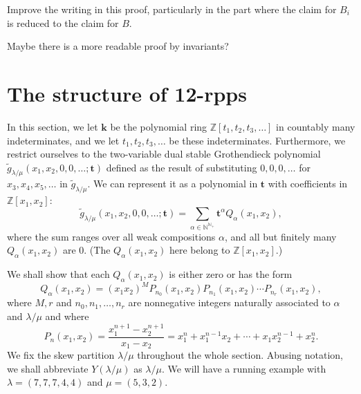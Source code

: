 \documentclass[numbers=enddot,12pt,final,onecolumn,notitlepage]{scrartcl}%
\theoremstyle{definition}
\newenvironment{todo}{}{}
\newcommand{\kk}{\mathbf{k}}
\let\sumnonlimits\sum
\renewcommand{\sum}{\sumnonlimits\limits}
\begin{document}
\begin{todo}
Improve the writing in this proof, particularly in the part where the
claim for $B_i$ is reduced to the claim for $B$.

Maybe there is a more readable proof by invariants?
\end{todo}



\section{The structure of 12-rpps}
\label{sect.structure}

\def\seplist{{\operatorname{seplist}}} %
\def\ceq{{\operatorname{ceq}}}
\def\ircont{{\operatorname{ircont}}}
\def\cont{{\operatorname{cont}}}
\def\ceqvar{{{\alpha}}} %
\def\seplistvar{{{\nu}}} %
\def\supp{{\operatorname{supp}}}
\def\NS{{\operatorname{NR}}}
\def\g{{\widetilde{g}}}
\def\t{{\mathbf{t}}}
\def\x{{\mathbf{x}}}
\def\lm{{\lambda/\mu}}
\def\lmp{{(\lambda/\mu)}}
\def\N{{\mathbb{N}}}
\def\Z{{\mathbb{Z}}}
\def\B{{\mathbf{B}}}

\def\OneTwoRPP{{\operatorname{RPP}^{12}\left(  \lambda/\mu\right)}}
\def\OneTwoRPPCutvar{{\operatorname{RPP}^{12}\left(  \lambda/\mu ;\seplistvar \right)}}
\def\flip{{\operatorname{flip}}}

In this section, 
we let $\kk$ be the polynomial ring $\Z\left[t_1, t_2, t_3, \ldots\right]$
in countably many indeterminates, and we let
$t_1, t_2, t_3, \ldots$ be these indeterminates.
Furthermore, we restrict ourselves to the
two-variable dual stable Grothendieck polynomial
$\g_\lm(x_1,x_2,0,0,\dots;\t)$ defined as the result of
substituting $0, 0, 0, \ldots$ for $x_3, x_4, x_5, \ldots$
in $\g_\lm$. We can represent it as a polynomial in
$\t$ with coefficients in $\Z[x_1,x_2]$:
$$\g_\lm(x_1,x_2,0,0,\dots;\t)=\sum_{\ceqvar\in \N^{\N_+}}\t^\ceqvar Q_\ceqvar(x_1,x_2),$$
where the sum ranges over all weak compositions $\alpha$,
and all but finitely many $Q_\ceqvar(x_1,x_2)$ are $0$.
(The $Q_\ceqvar(x_1,x_2)$ here belong to $\Z[x_1, x_2]$.)

We shall show that each $Q_\ceqvar(x_1,x_2)$ is either zero or has the form
\begin{equation}
\label{eq.Qalpha}
Q_\ceqvar(x_1,x_2)=(x_1x_2)^{M} P_{n_0}(x_1,x_2)P_{n_1}(x_1,x_2)\cdots P_{n_r}(x_1,x_2) , 
\end{equation}
where $M,r$ and $n_0,n_1,\dots,n_{r}$ are nonnegative integers naturally associated to $\ceqvar$ and $\lm$ and where
$$P_n(x_1,x_2)=\frac{x_1^{n+1}-x_2^{n+1}}{x_1-x_2}=x_1^{n}+x_1^{n-1}x_2+\cdots+x_1x_2^{n-1}+x_2^n.$$
We fix the skew partition $\lm$ throughout the whole section.
Abusing notation, we shall abbreviate $Y\left(\lm\right)$ as $\lm$.
We will have a running example with $\lambda=(7,7,7,4,4)$ and $\mu=(5,3,2)$.
\end{document}
